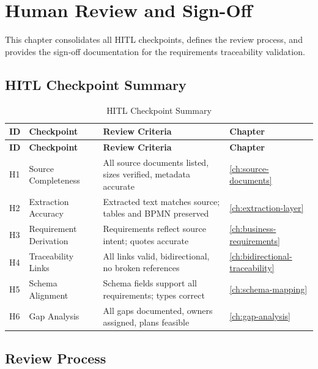 \chapter{Human Review and Sign-Off}
\label{ch:human-review-signoff}

This chapter consolidates all HITL checkpoints, defines the review process,
and provides the sign-off documentation for the requirements traceability
validation.

\section{HITL Checkpoint Summary}
\label{sec:checkpoint-summary}

\begin{longtable}{@{}C{1cm}L{3.5cm}L{6cm}C{2cm}@{}}
\caption{HITL Checkpoint Summary}
\label{tab:checkpoint-summary} \\
\toprule
\textbf{ID} & \textbf{Checkpoint} & \textbf{Review Criteria} & \textbf{Chapter} \\
\midrule
\endfirsthead
\toprule
\textbf{ID} & \textbf{Checkpoint} & \textbf{Review Criteria} & \textbf{Chapter} \\
\midrule
\endhead
H1 & Source Completeness & All source documents listed, sizes verified, metadata accurate & \cref{ch:source-documents} \\
H2 & Extraction Accuracy & Extracted text matches source; tables and BPMN preserved & \cref{ch:extraction-layer} \\
H3 & Requirement Derivation & Requirements reflect source intent; quotes accurate & \cref{ch:business-requirements} \\
H4 & Traceability Links & All links valid, bidirectional, no broken references & \cref{ch:bidirectional-traceability} \\
H5 & Schema Alignment & Schema fields support all requirements; types correct & \cref{ch:schema-mapping} \\
H6 & Gap Analysis & All gaps documented, owners assigned, plans feasible & \cref{ch:gap-analysis} \\
\bottomrule
\end{longtable}

\section{Review Process}
\label{sec:review-process}

